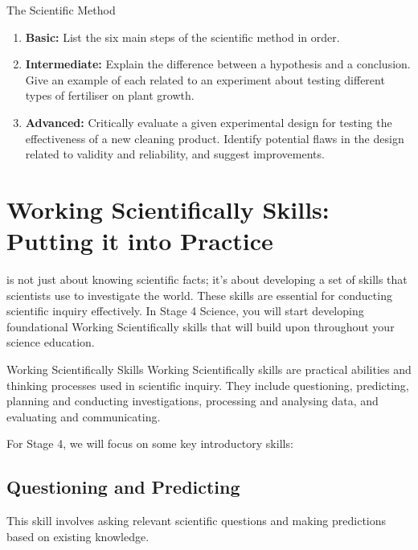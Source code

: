 \begin{example}
\begin{tieredquestions}{The Scientific Method}
\begin{enumerate}
    \item \textbf{Basic:} List the six main steps of the scientific method in order.
    \item \textbf{Intermediate:} Explain the difference between a hypothesis and a conclusion. Give an example of each related to an experiment about testing different types of fertiliser on plant growth.
    \item \textbf{Advanced:}  Critically evaluate a given experimental design for testing the effectiveness of a new cleaning product. Identify potential flaws in the design related to validity and reliability, and suggest improvements.
\end{enumerate}
\end{tieredquestions}

\section{Working Scientifically Skills: Putting it into Practice}

 is not just about knowing scientific facts; it’s about developing a set of skills that scientists use to investigate the world. These skills are essential for conducting scientific inquiry effectively. In Stage 4 Science, you will start developing foundational Working Scientifically skills that will build upon throughout your science education.


\begin{keyconcept}{Working Scientifically Skills}
Working Scientifically skills are practical abilities and thinking processes used in scientific inquiry. They include questioning, predicting, planning and conducting investigations, processing and analysing data, and evaluating and communicating.
\end{keyconcept}

For Stage 4, we will focus on some key introductory skills:

\subsection{Questioning and Predicting}

This skill involves asking relevant scientific questions and making predictions based on existing knowledge.


\end{example}
